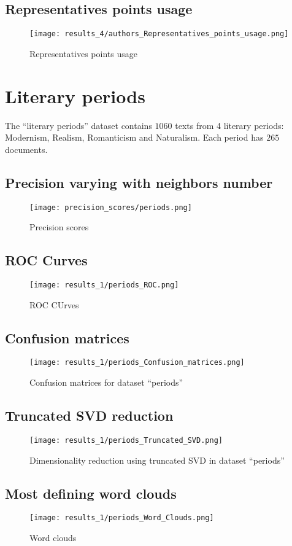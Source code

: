 \documentclass[\main/main.tex]{subfiles}
\begin{document}
\subsection{Representatives points usage}
\begin{figure}
	\texttt{[image: results\_4/authors\_Representatives\_points\_usage.png]}
	\caption{Representatives points usage}
\end{figure}

\clearpage
\section{Literary periods}
The ``literary periods'' dataset contains \(1060\) texts from 4 literary periods: Modernism, Realism, Romanticism and Naturalism. Each period has \(265\) documents.
\subsection{Precision varying with neighbors number}
\begin{figure}
	\texttt{[image: precision\_scores/periods.png]}
	\caption{Precision scores}
\end{figure}
\subsection{ROC Curves}
\begin{figure}
	\texttt{[image: results\_1/periods\_ROC.png]}
	\caption{ROC CUrves}
\end{figure}
\subsection{Confusion matrices}
\begin{figure}
	\texttt{[image: results\_1/periods\_Confusion\_matrices.png]}
	\caption{Confusion matrices for dataset ``periods''}
\end{figure}
\subsection{Truncated SVD reduction}
\begin{figure}
	\texttt{[image: results\_1/periods\_Truncated\_SVD.png]}
	\caption{Dimensionality reduction using truncated SVD in dataset ``periods''}
\end{figure}
\subsection{Most defining word clouds}
\begin{figure}
	\texttt{[image: results\_1/periods\_Word\_Clouds.png]}
	\caption{Word clouds}
\end{figure}
\end{document}
